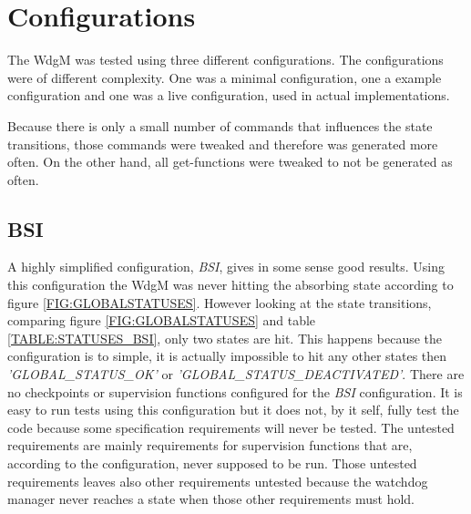 \section{Configurations}
The WdgM was tested using three different configurations. The configurations
were of different complexity. One was a minimal configuration, one a example
configuration and one was a live configuration, used in actual implementations.

Because there is only a small number of commands that influences the state
transitions, those commands were tweaked and therefore was generated more
often. On the other hand, all get-functions were tweaked to not be generated as often.

\subsection{BSI}
A highly simplified configuration, \emph{BSI}, gives in some sense good results.
Using this configuration the WdgM was never hitting the absorbing state
according to figure \ref{FIG:GLOBALSTATUSES}.  However looking at the state
transitions, comparing figure \ref{FIG:GLOBALSTATUSES} and table
\ref{TABLE:STATUSES_BSI}, only two states are hit. This happens
because the configuration is to simple, it is actually impossible to hit
any other states then \emph{'GLOBAL\_STATUS\_OK'} or
\emph{'GLOBAL\_STATUS\_DEACTIVATED'}. There are no checkpoints or supervision
functions configured for the \emph{BSI} configuration.
It is easy to run tests using this configuration but it does not, by it self,
fully test the code because some specification requirements will never be
tested. The untested requirements are mainly requirements for supervision
functions that are, according to the configuration, never supposed to be
run. Those untested requirements leaves also other requirements untested because
the watchdog manager never reaches a state when those other requirements must
hold.

